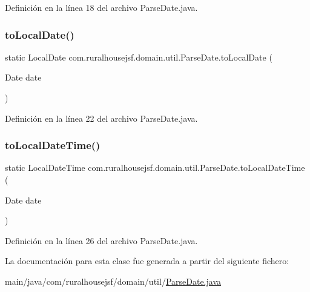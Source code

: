 Definición en la línea 18 del archivo Parse\+Date.\+java.

\mbox{\label{a00196_ab162361ec67bde08f594d22c04ccc283}} 
\subsubsection{\texorpdfstring{toLocalDate()}{toLocalDate()}}
{\footnotesize\ttfamily static Local\+Date com.\+ruralhousejsf.\+domain.\+util.\+Parse\+Date.\+to\+Local\+Date (\begin{DoxyParamCaption}\item[{Date}]{date }\end{DoxyParamCaption})\hspace{0.3cm}{\ttfamily [static]}}



Definición en la línea 22 del archivo Parse\+Date.\+java.

\mbox{\label{a00196_aacf06ccd03aba32238d32068f0fe1ca2}} 
\subsubsection{\texorpdfstring{toLocalDateTime()}{toLocalDateTime()}}
{\footnotesize\ttfamily static Local\+Date\+Time com.\+ruralhousejsf.\+domain.\+util.\+Parse\+Date.\+to\+Local\+Date\+Time (\begin{DoxyParamCaption}\item[{Date}]{date }\end{DoxyParamCaption})\hspace{0.3cm}{\ttfamily [static]}}



Definición en la línea 26 del archivo Parse\+Date.\+java.



La documentación para esta clase fue generada a partir del siguiente fichero\+:\begin{DoxyCompactItemize}
\item 
main/java/com/ruralhousejsf/domain/util/\mbox{\hyperlink{a00053}{Parse\+Date.\+java}}\end{DoxyCompactItemize}
